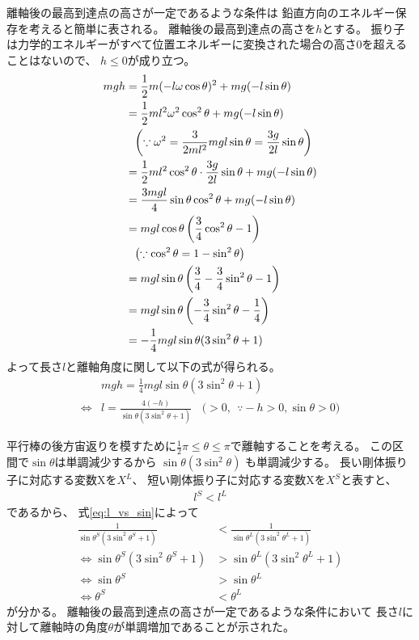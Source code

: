 \documentclass[a4paper,11pt]{jsarticle}
\begin{document}
離軸後の最高到達点の高さが一定であるような条件は
鉛直方向のエネルギー保存を考えると簡単に表される。
離軸後の最高到達点の高さを$h$とする。
振り子は力学的エネルギーがすべて位置エネルギーに変換された場合の高さ$0$を超えることはないので、
$h\leq0$が成り立つ。
\begin{align}
  mgh 
  &= \frac{1}{2}m (-l \omega \cos \theta)^2 + mg (-l \sin \theta)
  \label{eq:energy_vertical}
  \\
  &= \frac{1}{2}ml^2 \omega^2 \cos^2 \theta + mg (-l \sin \theta)
  \\
  & \ \ \left( \because \omega^2 = \frac{3}{2ml^2}mgl\sin\theta = \frac{3g}{2l}\sin\theta \right) \notag
  \\
  &= \frac{1}{2}ml^2 \cos^2 \theta \cdot \frac{3g}{2l}\sin\theta + mg (-l \sin \theta)
  \\
  &= \frac{3mgl}{4}\sin\theta \cos^2\theta + mg (-l\sin\theta)
  \\
  &= mgl\cos\theta \left( \frac{3}{4}\cos^2\theta - 1\right)
  \\
  & \ \ \left( \because \cos^2\theta = 1 - \sin^2\theta \right) \notag
  \\
  &= mgl\sin\theta \left( \frac{3}{4} - \frac{3}{4}\sin^2\theta - 1 \right)
  \\
  &= mgl\sin\theta \left( - \frac{3}{4}\sin^2\theta - \frac{1}{4} \right)
  \\
  &= -\frac{1}{4}mgl\sin\theta (3\sin^2\theta + 1)
\end{align}
よって長さ$l$と離軸角度に関して以下の式が得られる。
\begin{align}
  & mgh = \frac{1}{4}mgl \sin\theta (3\sin^2\theta + 1)
  \\
  \Leftrightarrow
  & l = \frac{4(-h)}{\sin\theta (3\sin^2\theta + 1)} \ \ \ \ \Big( > 0, \ \ \because -h > 0, \sin\theta > 0 \Big)
  \label{eq:l_vs_sin}
\end{align}

平行棒の後方宙返りを模すために$\frac{1}{2}\pi \leq \theta \leq \pi$で離軸することを考える。
この区間で$\sin\theta$は単調減少するから
$\sin\theta (3\sin^2\theta)$ も単調減少する。
長い剛体振り子に対応する変数Xを$X^L$、
短い剛体振り子に対応する変数Xを$X^S$と表すと、
\begin{align}
  l^S < l^L
\end{align}
であるから、
式\ref{eq:l_vs_sin}によって
\begin{align}
  \frac{1}{\sin\theta^S (3\sin^2\theta^S + 1)} &< \frac{1}{\sin\theta^L (3\sin^2\theta^L + 1)}
  \\
  \Leftrightarrow
  \sin\theta^S (3\sin^2\theta^S + 1) &> \sin\theta^L (3\sin^2\theta^L + 1)
  \\
  \Leftrightarrow
  \sin\theta^S &> \sin\theta^L
  \\
  \Leftrightarrow
  \theta^S &< \theta^L
\end{align}
が分かる。
離軸後の最高到達点の高さが一定であるような条件において
長さ$l$に対して離軸時の角度$\theta$が単調増加であることが示された。
\end{document}
